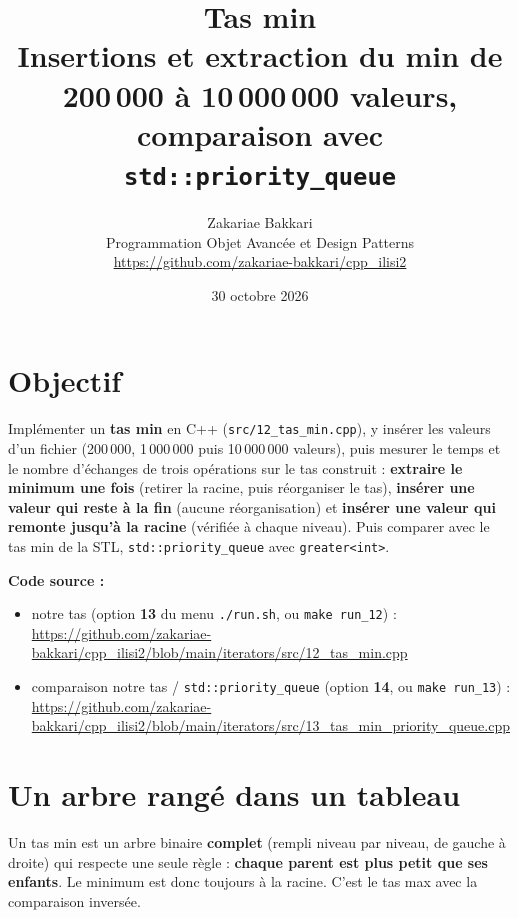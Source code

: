 \documentclass[11pt,a4paper]{article}
\title{\textbf{Tas min}\\[4pt]
       \large Insertions et extraction du min de 200\,000 à 10\,000\,000 valeurs, comparaison avec \texttt{std::priority\_queue}}
\author{Zakariae Bakkari\\
        \small Programmation Objet Avancée et Design Patterns\\
        \small\url{https://github.com/zakariae-bakkari/cpp_ilisi2}}
\date{30 octobre 2026}
\begin{document}
\maketitle

\section{Objectif}

Implémenter un \textbf{tas min} en C++ (\texttt{src/12\_tas\_min.cpp}), y insérer les
valeurs d'un fichier (200\,000, 1\,000\,000 puis 10\,000\,000 valeurs), puis mesurer le temps
et le nombre d'échanges de trois opérations sur le tas construit :
\textbf{extraire le minimum une fois} (retirer la racine, puis réorganiser le tas),
\textbf{insérer une valeur qui reste à la fin} (aucune réorganisation) et
\textbf{insérer une valeur qui remonte jusqu'à la racine} (vérifiée à chaque niveau).
Puis comparer avec le tas min de la STL, \texttt{std::priority\_queue} avec
\texttt{greater<int>}.

\textbf{Code source :}
\begin{itemize}
  \item notre tas (option \textbf{13} du menu \texttt{./run.sh}, ou \texttt{make run\_12}) :\\
        \url{https://github.com/zakariae-bakkari/cpp_ilisi2/blob/main/iterators/src/12_tas_min.cpp}
  \item comparaison notre tas / \texttt{std::priority\_queue} (option \textbf{14}, ou \texttt{make run\_13}) :\\
        \url{https://github.com/zakariae-bakkari/cpp_ilisi2/blob/main/iterators/src/13_tas_min_priority_queue.cpp}
\end{itemize}

\section{Un arbre rangé dans un tableau}

Un tas min est un arbre binaire \textbf{complet} (rempli niveau par niveau, de gauche à
droite) qui respecte une seule règle : \textbf{chaque parent est plus petit que ses
enfants}. Le minimum est donc toujours à la racine. C'est le tas max avec la comparaison
inversée.
\end{document}
